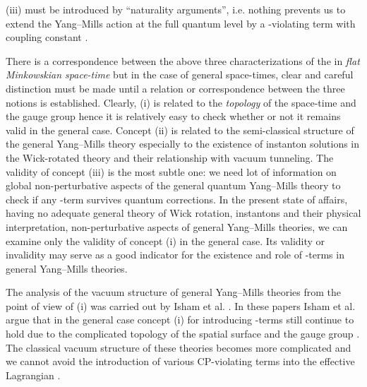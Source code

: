 \documentclass[a4paper,12pt,draft]{article}
\providecommand{\tr}{{\rm tr}}
\begin{document}
(iii) \myHighlight{$\theta$}\coordHE{} must be introduced by ``naturality arguments'', i.e.
nothing prevents us to extend the Yang--Mills action at the full quantum 
level by a \coordHE{}-violating term \myHighlight{$\tr\left( F_A\wedge F_A\right)$}\coordHE{} with
coupling constant \myHighlight{$\theta$}\coordHE{}.

There is a correspondence between the above three characterizations of the
\myHighlight{$\theta$}\coordHE{} in {\it flat Min\-kow\-ski\-an space-time} but in the case of
general space-times, clear and careful distinction must be made until a
relation or correspondence between the three notions is established.
Clearly, (i) is related to the {\it topology} of the space-time and
the gauge group hence it is relatively easy to check whether or not it
remains valid in the general case. Concept (ii) is related to the
semi-classical structure of the
general Yang--Mills theory especially to the existence of instanton
solutions in the Wick-rotated theory and their relationship with vacuum
tunneling. The validity of concept (iii) is the most subtle one: we need
lot of information on global non-perturbative aspects of the general
quantum Yang--Mills theory to check if any \myHighlight{$\theta$}\coordHE{}-term survives quantum
corrections. In the present state of affairs, having no adequate general
theory of Wick rotation, instantons and their physical interpretation,
non-perturbative aspects of general Yang--Mills theories, we can examine
only the validity of concept (i) in the general case. Its validity or
invalidity may serve as a good indicator for the existence and role of
\myHighlight{$\theta$}\coordHE{}-terms in general Yang--Mills theories.

The analysis of the vacuum structure of general Yang--Mills
theories from the point of view of (i) was carried out by Isham et al.
\cite{isham1}\cite{isham2}\cite{isham3}\cite{isham4}\cite{isham5}. In
these papers Isham et al. argue that in the general case concept (i) for
introducing \myHighlight{$\theta$}\coordHE{}-terms still continue to hold due to the complicated
topology of the spatial surface \coordHE{} and the gauge group \coordHE{} \cite{isham1}.
The classical vacuum structure of these theories becomes more complicated
and we cannot avoid the introduction of various CP-violating terms into
the effective Lagrangian \cite{isham5}. 
\end{document}
